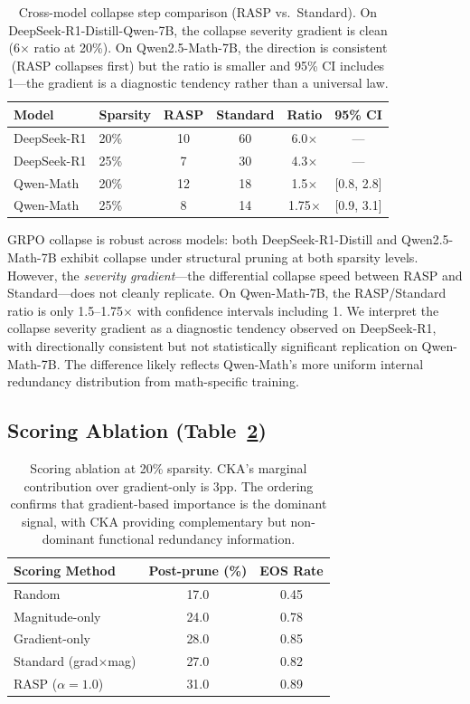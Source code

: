 \documentclass[11pt,a4paper]{article}
\begin{document}
\begin{table}[t]
\centering
\small
\begin{tabular}{llcccc}
\toprule
\textbf{Model} & \textbf{Sparsity} & \textbf{RASP} & \textbf{Standard} & \textbf{Ratio} & \textbf{95\% CI} \\
\midrule
DeepSeek-R1 & 20\% & 10 & 60 & 6.0$\times$ & --- \\
DeepSeek-R1 & 25\% & 7 & 30 & 4.3$\times$ & --- \\
\midrule
Qwen-Math & 20\% & 12 & 18 & 1.5$\times$ & [0.8, 2.8] \\
Qwen-Math & 25\% & 8 & 14 & 1.75$\times$ & [0.9, 3.1] \\
\bottomrule
\end{tabular}
\caption{Cross-model collapse step comparison (RASP vs.\ Standard). On DeepSeek-R1-Distill-Qwen-7B, the collapse severity gradient is clean (6$\times$ ratio at 20\%). On Qwen2.5-Math-7B, the direction is consistent (RASP collapses first) but the ratio is smaller and 95\% CI includes 1---the gradient is a diagnostic tendency rather than a universal law.}
\label{tab:crossmodel}
\end{table}

GRPO collapse is robust across models: both DeepSeek-R1-Distill and Qwen2.5-Math-7B exhibit collapse under structural pruning at both sparsity levels. However, the \emph{severity gradient}---the differential collapse speed between RASP and Standard---does not cleanly replicate. On Qwen-Math-7B, the RASP/Standard ratio is only 1.5--1.75$\times$ with confidence intervals including 1. We interpret the collapse severity gradient as a diagnostic tendency observed on DeepSeek-R1, with directionally consistent but not statistically significant replication on Qwen-Math-7B. The difference likely reflects Qwen-Math's more uniform internal redundancy distribution from math-specific training.

\subsection{Scoring Ablation (Table~\ref{tab:scoring})}

\begin{table}[t]
\centering
\small
\begin{tabular}{lcc}
\toprule
\textbf{Scoring Method} & \textbf{Post-prune (\%)} & \textbf{EOS Rate} \\
\midrule
Random & 17.0 & 0.45 \\
Magnitude-only & 24.0 & 0.78 \\
Gradient-only & 28.0 & 0.85 \\
Standard (grad$\times$mag) & 27.0 & 0.82 \\
RASP ($\alpha=1.0$) & 31.0 & 0.89 \\
\bottomrule
\end{tabular}
\caption{Scoring ablation at 20\% sparsity. CKA's marginal contribution over gradient-only is 3pp. The ordering confirms that gradient-based importance is the dominant signal, with CKA providing complementary but non-dominant functional redundancy information.}
\label{tab:scoring}
\end{table}
\end{document}
